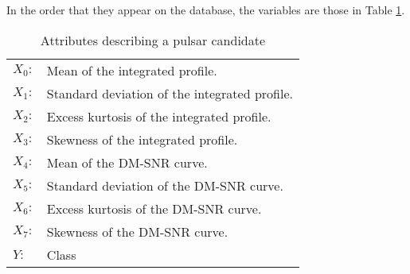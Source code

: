 In the order that they appear on the database, the variables are those in Table
\ref{tab:variables}.

\begin{table}[ht]
    \begin{tabular}{l|l}
        $X_0:$ & Mean of the integrated profile.\\
        $X_1:$ & Standard deviation of the integrated profile.\\
        $X_2:$ & Excess kurtosis of the integrated profile.\\
        $X_3:$ & Skewness of the integrated profile.\\
        $X_4:$ & Mean of the DM-SNR curve.\\
        $X_5:$ & Standard deviation of the DM-SNR curve.\\
        $X_6:$ & Excess kurtosis of the DM-SNR curve.\\
        $X_7:$ & Skewness of the DM-SNR curve.\\
        $Y:$   & Class 
    \end{tabular}
    \caption{Attributes describing a pulsar candidate\label{tab:variables}}
\end{table}